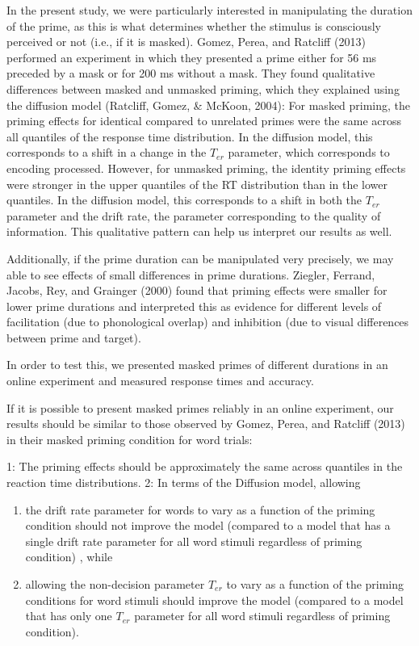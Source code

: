 \documentclass[
  english,
  man]{apa6}
\begin{document}
In the present study, we were particularly interested in manipulating the duration of the prime, as this is what determines whether the stimulus is consciously perceived or not (i.e., if it is masked). Gomez, Perea, and Ratcliff (2013) performed an experiment in which they presented a prime either for 56 ms preceded by a mask or for 200 ms without a mask. They found qualitative differences between masked and unmasked priming, which they explained using the diffusion model (Ratcliff, Gomez, \& McKoon, 2004): For masked priming, the priming effects for identical compared to unrelated primes were the same across all quantiles of the response time distribution. In the diffusion model, this corresponds to a shift in a change in the \(T_{er}\) parameter, which corresponds to encoding processed. However, for unmasked priming, the identity priming effects were stronger in the upper quantiles of the RT distribution than in the lower quantiles. In the diffusion model, this corresponds to a shift in both the \(T_{er}\) parameter and the drift rate, the parameter corresponding to the quality of information. This qualitative pattern can help us interpret our results as well.

Additionally, if the prime duration can be manipulated very precisely, we may able to see effects of small differences in prime durations. Ziegler, Ferrand, Jacobs, Rey, and Grainger (2000) found that priming effects were smaller for lower prime durations and interpreted this as evidence for different levels of facilitation (due to phonological overlap) and inhibition (due to visual differences between prime and target).

In order to test this, we presented masked primes of different durations in an online experiment and measured response times and accuracy.

If it is possible to present masked primes reliably in an online experiment, our results should be similar to those observed by Gomez, Perea, and Ratcliff (2013) in their masked priming condition for word trials:

1: The priming effects should be approximately the same across quantiles in the reaction time distributions. 2: In terms of the Diffusion model, allowing

\begin{enumerate}
\def\labelenumi{\alph{enumi})}
\item
  the drift rate parameter for words to vary as a function of the priming condition should not improve the model (compared to a model that has a single drift rate parameter for all word stimuli regardless of priming condition) , while
\item
  allowing the non-decision parameter \(T_{er}\) to vary as a function of the priming conditions for word stimuli should improve the model (compared to a model that has only one \(T_{er}\) parameter for all word stimuli regardless of priming condition).
\end{enumerate}
\end{document}
